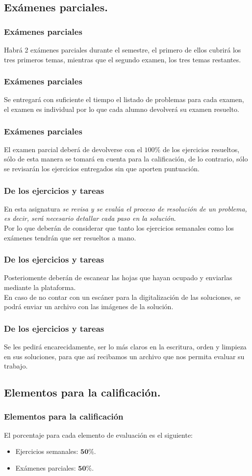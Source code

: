 \subsection{Exámenes parciales.}
\begin{frame}
\frametitle{Exámenes parciales}
Habrá 2 exámenes parciales durante el semestre, el primero de ellos cubrirá los tres primeros temas, mientras que el segundo examen, los tres temas restantes.
\end{frame}
\begin{frame}
\frametitle{Exámenes parciales}
Se entregará con suficiente el tiempo el listado de problemas para cada examen, el examen es individual por lo que cada alumno devolverá su examen resuelto.
\end{frame}
\begin{frame}
\frametitle{Exámenes parciales}
El examen parcial deberá de devolverse con el $100\%$ de los ejercicios resueltos, sólo de esta manera se tomará en cuenta para la calificación, de lo contrario, sólo se revisarán los ejercicios entregados sin que aporten puntuación.
\end{frame}
\begin{frame}
\frametitle{De los ejercicios y tareas}
En esta asignatura \emph{se revisa y se evalúa el proceso de resolución de un problema, es decir, será necesario detallar cada paso en la solución}.
\\
\bigskip
\pause
Por lo que deberán de considerar que tanto los ejercicios semanales como los exámenes tendrán que ser resueltos a mano.
\end{frame}
\begin{frame}
\frametitle{De los ejercicios y tareas}
Posteriomente deberán de escanear las hojas que hayan ocupado y enviarlas mediante la plataforma.
\\
\bigskip
\pause
En caso de no contar con un escáner para la digitalización de las soluciones, se podrá enviar un archivo con las imágenes de la solución.
\end{frame}
\begin{frame}
\frametitle{De los ejercicios y tareas}
Se les pedirá encarecidamente, ser lo más claros en la escritura, orden y limpieza en sus soluciones, para que así recibamos un archivo que nos permita evaluar su trabajo.
\end{frame}
\subsection{Elementos para la calificación.}
\begin{frame}
\frametitle{Elementos para la calificación}
El porcentaje para cada elemento de evaluación es el siguiente:
\begin{itemize}
\setlength{\itemsep}{0mm}
\item Ejercicios semanales: $\mathbf{50\%}$.
\item Exámenes parciales: $\mathbf{50\%}$.
\end{itemize}
\end{frame}
